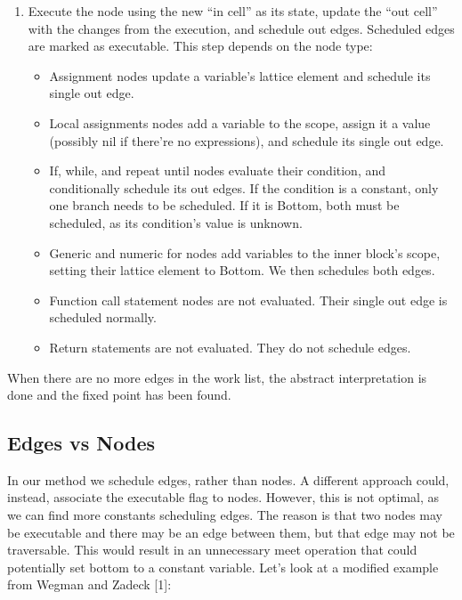 \documentclass[
]{article}
\begin{document}
\begin{enumerate}
\def\labelenumi{\arabic{enumi}.}
\setcounter{enumi}{2}
\item
  Execute the node using the new ``in cell'' as its state, update the
  ``out cell'' with the changes from the execution, and schedule out
  edges. Scheduled edges are marked as executable. This step depends on
  the node type:

  \begin{itemize}
  \item
    Assignment nodes update a variable's lattice element and schedule
    its single out edge.
  \item
    Local assignments nodes add a variable to the scope, assign it a
    value (possibly nil if there're no expressions), and schedule its
    single out edge.
  \item
    If, while, and repeat until nodes evaluate their condition, and
    conditionally schedule its out edges. If the condition is a
    constant, only one branch needs to be scheduled. If it is Bottom,
    both must be scheduled, as its condition's value is unknown.
  \item
    Generic and numeric for nodes add variables to the inner block's
    scope, setting their lattice element to Bottom. We then schedules
    both edges.
  \item
    Function call statement nodes are not evaluated. Their single out
    edge is scheduled normally.
  \item
    Return statements are not evaluated. They do not schedule edges.
  \end{itemize}
\end{enumerate}

When there are no more edges in the work list, the abstract
interpretation is done and the fixed point has been found.

\hypertarget{edges-vs-nodes}{%
\subsection{Edges vs Nodes}\label{edges-vs-nodes}}

In our method we schedule edges, rather than nodes. A different approach
could, instead, associate the executable flag to nodes. However, this is
not optimal, as we can find more constants scheduling edges. The reason
is that two nodes may be executable and there may be an edge between
them, but that edge may not be traversable. This would result in an
unnecessary meet operation that could potentially set bottom to a
constant variable. Let's look at a modified example from Wegman and
Zadeck {[}1{]}:
\end{document}
